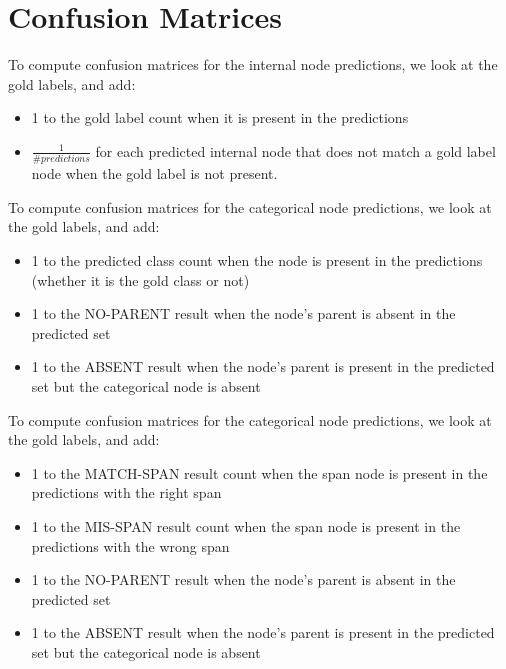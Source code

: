 \clearpage

\section{Confusion Matrices}
\label{sec:conf_mat}

To compute confusion matrices for the internal node predictions, we look at the gold labels, and add:
\begin{itemize}
\item 1 to the gold label count when it is present in the predictions
\item $\frac{1}{\# predictions}$ for each predicted internal node that does not match a gold label node when the gold label is not present.
\end{itemize}

To compute confusion matrices for the categorical node predictions, we look at the gold labels, and add:
\begin{itemize}
\item 1 to the predicted class count when the node is present in the predictions (whether it is the gold class or not)
\item 1 to the NO-PARENT result when the node's parent is absent in the predicted set
\item 1 to the ABSENT result when the node's parent is present in the predicted set but the categorical node is absent
\end{itemize}

To compute confusion matrices for the categorical node predictions, we look at the gold labels, and add:
\begin{itemize}
\item 1 to the MATCH-SPAN result count when the span node is present in the predictions with the right span
\item 1 to the MIS-SPAN result count when the span node is present in the predictions with the wrong span
\item 1 to the NO-PARENT result when the node's parent is absent in the predicted set
\item 1 to the ABSENT result when the node's parent is present in the predicted set but the categorical node is absent
\end{itemize}

